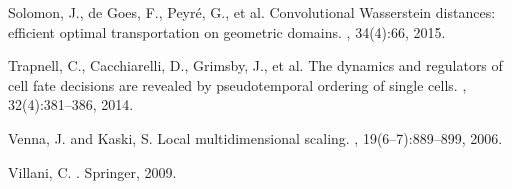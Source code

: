 \documentclass{article}
\begin{document}
\begin{thebibliography}{}
Solomon, J., de Goes, F., Peyr\'e, G., et al.
\newblock Convolutional Wasserstein distances: efficient optimal transportation on
geometric domains.
, 34(4):66, 2015.

Trapnell, C., Cacchiarelli, D., Grimsby, J., et al.
\newblock The dynamics and regulators of cell fate decisions are revealed by
pseudotemporal ordering of single cells.
, 32(4):381--386, 2014.

Venna, J. and Kaski, S.
\newblock Local multidimensional scaling.
, 19(6--7):889--899, 2006.

Villani, C.
.
\newblock Springer, 2009.

\end{thebibliography}
\end{document}

